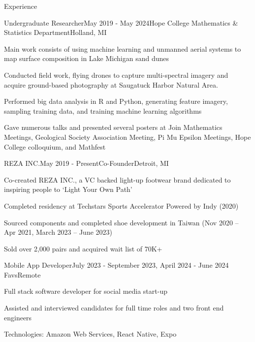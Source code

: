 \documentclass[
	11pt, %
]{resume} %
\begin{document}

\begin{rSection}{Experience}



  \begin{rSubsection}{Undergraduate Researcher}{May 2019 - May 2024}{Hope College Mathematics \& Statistics Department}{Holland, MI}
  \item Main work consists of using machine learning and unmanned aerial systems to map surface composition in Lake Michigan sand dunes
  \item Conducted field work, flying drones to capture multi-spectral imagery and acquire  ground-based photography  at Saugatuck Harbor Natural Area.
  \item Performed big data analysis in R and Python, generating feature imagery, sampling training data, and training machine learning algorithms
  \item Gave numerous talks and presented several posters at Join Mathematics Meetings, Geological Society Association Meeting, Pi Mu Epsilon Meetings, Hope College colloquium, and Mathfest
	\end{rSubsection}

\pagebreak

	\begin{rSubsection}{REZA INC.}{May 2019 - Present}{Co-Founder}{Detroit, MI}
  \item Co-created REZA INC., a VC backed light-up footwear
brand dedicated to inspiring people to ‘Light Your Own
Path’
\item Completed residency at Techstars Sports Accelerator Powered by Indy (2020)\item Sourced components and completed shoe development in Taiwan (Nov 2020 – Apr 2021, March 2023 – June 2023)
\item Sold over 2,000 pairs and acquired wait list of 70K+
	\end{rSubsection}



	\begin{rSubsection}{Mobile App Developer}{July 2023 - September 2023, April 2024 - June 2024 }{Favs}{Remote}
  \item Full stack software developer for social media start-up
  \item Assisted and interviewed candidates for full time roles
and two front end engineers
\item Technologies: Amazon Web Services, React Native, Expo


\end{rSubsection}
\end{rSection}
\end{document}
